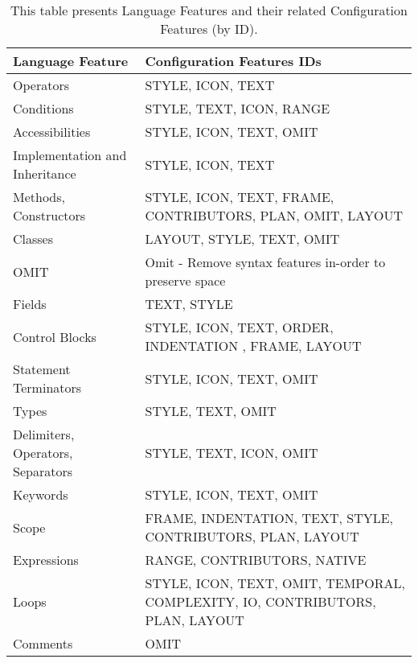 \begin{table}[H]
\centering
\begin{tabular}{|l|p{11cm}|}
\hline
{\bf Language Feature}            & {\bf Configuration Features IDs}                                              \\ \hline
Operators                         & STYLE, ICON, TEXT                                                             \\ \hline
Conditions                        & STYLE, TEXT, ICON, RANGE                                                      \\ \hline
Accessibilities                   & STYLE, ICON, TEXT, OMIT                                                       \\ \hline
Implementation and Inheritance    & STYLE, ICON, TEXT                                                             \\ \hline
Methods, Constructors             & STYLE, ICON, TEXT, FRAME, CONTRIBUTORS, PLAN, OMIT, LAYOUT                    \\ \hline
Classes                           & LAYOUT, STYLE, TEXT, OMIT                                                     \\ \hline
OMIT                              & Omit - Remove syntax features in-order to preserve space                      \\ \hline
Fields                            & TEXT, STYLE                                                                   \\ \hline
Control Blocks                    & STYLE, ICON, TEXT, ORDER, INDENTATION , FRAME, LAYOUT                         \\ \hline
Statement Terminators             & STYLE, ICON, TEXT, OMIT                                                       \\ \hline
Types                             & STYLE, TEXT, OMIT                                                             \\ \hline
Delimiters, Operators, Separators & STYLE, TEXT, ICON, OMIT                                                       \\ \hline
Keywords                          & STYLE, ICON, TEXT, OMIT                                                       \\ \hline
Scope                             & FRAME, INDENTATION, TEXT, STYLE, CONTRIBUTORS, PLAN, LAYOUT                   \\ \hline
Expressions                       & RANGE, CONTRIBUTORS, NATIVE                                                   \\ \hline
Loops                             & STYLE, ICON, TEXT, OMIT, TEMPORAL, COMPLEXITY, IO, CONTRIBUTORS, PLAN, LAYOUT \\ \hline
Comments                          & OMIT                                                                          \\ \hline
\end{tabular}
\caption{This table presents Language Features and their related Configuration Features (by ID).}
\label{tab15}
\end{table}